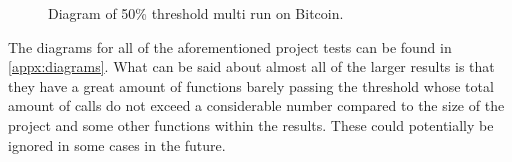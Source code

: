 \begin{figure}[H]
	\caption{Diagram of 50\% threshold multi run on Bitcoin.}
	\label{fig:bc-50-multi}
\end{figure}

The diagrams for all of the aforementioned project tests can be found in \cref{appx:diagrams}.
What can be said about almost all of the larger results is that they have a great amount of functions barely passing the threshold whose total
amount of calls do not exceed a considerable number compared to the size of the project and some other functions within the results. These could
potentially be ignored in some cases in the future.

